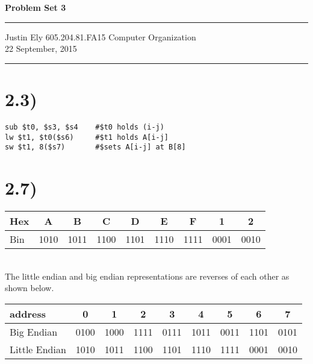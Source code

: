 \documentclass[a4paper,11pt]{article}
\begin{document}
\begin{flushright}

\vspace{1.1cm}

{\bf\Huge Problem Set 3}

\rule{0.25\linewidth}{0.5pt}

\vspace{0.5cm}
Justin Ely
\linebreak
\newline
\footnotesize{605.204.81.FA15 Computer Organization\\}
\vspace{0.5cm}
22 September, 2015
\end{flushright}

\noindent\rule{\linewidth}{1.0pt}



\section*{2.3)}

\begin{verbatim}
sub $t0, $s3, $s4    #$t0 holds (i-j)
lw $t1, $t0($s6)     #$t1 holds A[i-j]
sw $t1, 8($s7)       #$sets A[i-j] at B[8]
\end{verbatim}


\section*{2.7)} 

\begin{tabular}{| l | c | c | c | c | c | c | c | c |}
  \hline	
  Hex & A & B & C & D & E & F & 1 & 2 \\  \hline  		
  Bin & 1010 & 1011 & 1100 & 1101 & 1110 & 1111 & 0001 & 0010 \\ \hline
\end{tabular} \\

The little endian and big endian representations are reverses of each other as shown below. \\

\noindent \begin{tabular}{| l | c | c | c | c | c | c | c | c |}
  \hline
  address & 0 & 1 & 2 & 3 & 4 & 5 & 6 & 7 \\ \hline	
  Big Endian  & 0100 & 1000 & 1111 & 0111 & 1011 & 0011 & 1101 & 0101 \\  \hline  		
  Little Endian & 1010 & 1011 & 1100 & 1101 & 1110 & 1111 & 0001 & 0010 \\ \hline
\end{tabular} \\
\end{document}
